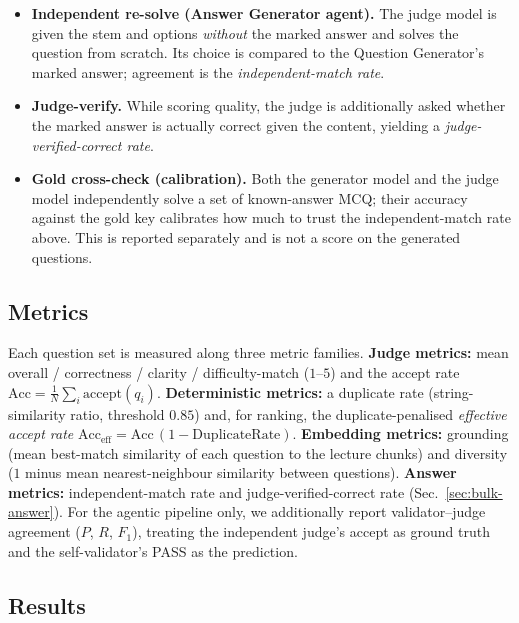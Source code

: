 \begin{itemize}
  \item \textbf{Independent re-solve (Answer Generator agent).} The judge model is
        given the stem and options \emph{without} the marked answer and solves the
        question from scratch. Its choice is compared to the Question Generator's
        marked answer; agreement is the \emph{independent-match rate}.
  \item \textbf{Judge-verify.} While scoring quality, the judge is additionally
        asked whether the marked answer is actually correct given the content,
        yielding a \emph{judge-verified-correct rate}.
  \item \textbf{Gold cross-check (calibration).} Both the generator model and the
        judge model independently solve a set of known-answer MCQ; their accuracy
        against the gold key calibrates how much to trust the independent-match
        rate above. This is reported separately and is not a score on the
        generated questions.
\end{itemize}

\subsection{Metrics}
\label{sec:bulk-metrics}

Each question set is measured along three metric families. \textbf{Judge metrics:}
mean overall / correctness / clarity / difficulty-match ($1$--$5$) and the accept
rate $\mathrm{Acc}=\frac{1}{N}\sum_i \text{accept}(q_i)$. \textbf{Deterministic
metrics:} a duplicate rate (string-similarity ratio, threshold $0.85$) and, for
ranking, the duplicate-penalised \emph{effective accept rate}
$\mathrm{Acc}_{\mathrm{eff}}=\mathrm{Acc}\,(1-\mathrm{DuplicateRate})$.
\textbf{Embedding metrics:} grounding (mean best-match similarity of each question
to the lecture chunks) and diversity ($1$ minus mean nearest-neighbour similarity
between questions). \textbf{Answer metrics:} independent-match rate and
judge-verified-correct rate (Sec.~\ref{sec:bulk-answer}). For the agentic pipeline
only, we additionally report validator--judge agreement ($P$, $R$, $F_1$), treating
the independent judge's accept as ground truth and the self-validator's PASS as the
prediction.

\subsection{Results}
\label{sec:bulk-results}

